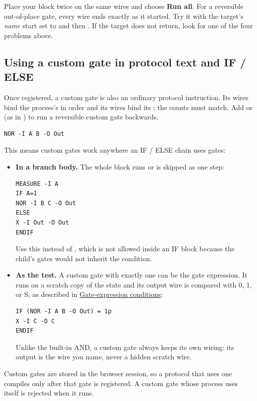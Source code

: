 \begin{beginnerbox}
Place your block twice on the same wires and choose \textbf{Run all}. For a
reversible out-of-place gate, every wire ends exactly as it started. Try it
with the target's \emph{name} start set to  and then . If
the target does not return, look for one of the four problems above.
\end{beginnerbox}

\subsection{Using a custom gate in protocol text and IF / ELSE}
\hypertarget{custom-gates-in-text}{}

Once registered, a custom gate is also an ordinary protocol instruction. Its
 wires bind the process's  in order and its 
wires bind its ; the counts must match. Add  or
 (as in ) to run a reversible custom gate backwards.
\begin{lstlisting}
NOR -I A B -O Out
\end{lstlisting}
This means custom gates work anywhere an IF / ELSE chain uses gates:
\begin{itemize}
  \item \textbf{In a branch body.} The whole block runs or is skipped as one
  step:
\begin{lstlisting}
MEASURE -I A
IF A=1
NOR -I B C -O Out
ELSE
X -I Out -O Out
ENDIF
\end{lstlisting}
  Use this instead of , which is not allowed inside an IF
  block because the child's gates would not inherit the condition.
  \item \textbf{As the test.} A custom gate with exactly one
   can be the gate expression. It runs on a scratch copy of
  the state and its output wire is compared with 0, 1, or S, as described in
  \hyperlink{if-gate-expression}{Gate-expression conditions}:
\begin{lstlisting}
IF (NOR -I A B -O Out) = 1p
X -I C -O C
ENDIF
\end{lstlisting}
  Unlike the built-in AND, a custom gate always keeps its own wiring: its
  output is the  wire you name, never a hidden scratch wire.
\end{itemize}
Custom gates are stored in the browser session, so a protocol that uses one
compiles only after that gate is registered. A custom gate whose process uses
itself is rejected when it runs.

